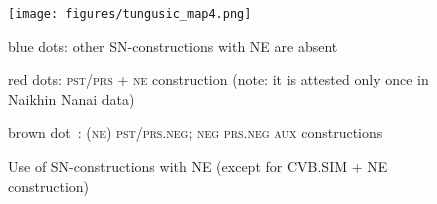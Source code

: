 \documentclass[output=paper]{langscibook}
\begin{document}
\pagebreak
\newpage
\begin{figure}[!h]
    \captionsetup{name=Map}
    \texttt{[image: figures/tungusic\_map4.png]}
    \caption{Use of SN-constructions with NE (except for CVB.SIM + NE construction)}
    \label{fig:T4}

    blue dots: other SN-constructions with NE are absent

    red dots: \textsc{pst/prs + ne} construction (note: it is attested only once in Naikhin Nanai data)

    brown dot : \textsc{(ne) pst/prs.neg}; \textsc{neg prs.neg aux} constructions

\end{figure}



\pagebreak
\newpage
{\sloppy\printbibliography[heading=subbibliography,notkeyword=this]}
\end{document}
